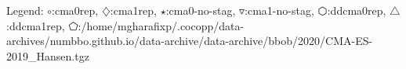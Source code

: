 Legend: {\color{NavyBlue}$\circ$}:cma0rep, {\color{Magenta}$\diamondsuit$}:cma1rep, {\color{Orange}$\star$}:cma0-no-stag, {\color{CornflowerBlue}$\triangledown$}:cma1-no-stag, {\color{red}$\varhexagon$}:ddcma0rep, {\color{YellowGreen}$\triangle$}:ddcma1rep, {\color{cyan}$\pentagon$}:/home/mgharafixp/.cocopp/data-archives/numbbo.github.io/data-archive/data-archive/bbob/2020/CMA-ES-2019\_Hansen.tgz